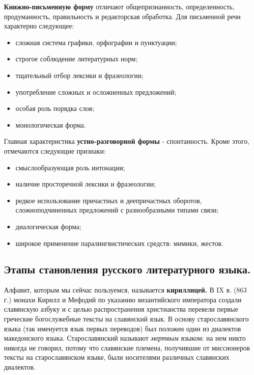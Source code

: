 \textbf{Книжно-письменную форму} отличают общепризнанность, определенность, продуманность, правильность и редакторская обработка.
Для письменной речи характерно следующее:

\begin{itemize}
    \item сложная система графики, орфографии и пунктуации;
    \item строгое соблюдение литературных норм;
    \item тщательный отбор лексики и фразеологии;
    \item употребление сложных и осложненных предложений;
    \item особая роль порядка слов;
    \item монологическая форма.
\end{itemize}

Главная характеристика \textbf{устно-разговорной формы} - спонтанность. Кроме этого, отмечаются следующие признаки:

\begin{itemize}
    \item смыслообразующая роль интонации;
    \item наличие просторечной лексики и фразеологии;
    \item редкое использование причастных и деепричастных оборотов, сложноподчиненных предложений с разнообразными типами связи;
    \item диалогическая форма;
    \item широкое применение паралингвистических средств: мимики, жестов.
\end{itemize}

\subsection*{Этапы становления русского литературного языка.}

Алфавит, которым мы сейчас пользуемся, называется \textbf{кириллицей.}
В IX в. (863 г.) монахи Кирилл и Мефодий по указанию византийского императора создали славянскую азбуку и с целью распространения христианства перевели первые греческие богослужебные тексты на славянский язык.
В основу старославянского языка (так именуется язык первых переводов) был положен один из диалектов македонского языка.
Старославянский называют \textit{мертвым} языком: на нем никто никогда не говорил, потому что славянские племена, получившие от миссионеров тексты на старославянском языке, были носителями различных славянских диалектов.

